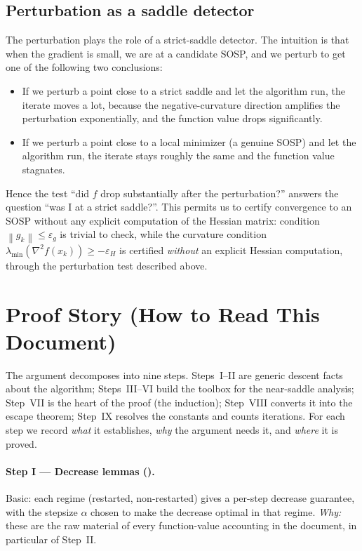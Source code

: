 \documentclass[11pt,a4paper]{article}
\theoremstyle{plain}
\theoremstyle{definition}
\newcommand{\norm}[1]{\left\|#1\right\|}
\newcommand{\eps}{\varepsilon}
\newcommand{\epsg}{\eps_{g}}
\newcommand{\epsH}{\eps_{H}}
\newcommand{\hess}{\nabla^{2}}
\begin{document}
\subsection{Perturbation as a saddle detector}\label{sub:detector}
The perturbation plays the role of a strict-saddle detector. The intuition is that when
the gradient is small, we are at a candidate SOSP, and we perturb to get one of the
following two conclusions:
\begin{itemize}[leftmargin=*]
  \item If we perturb a point close to a strict saddle and let the algorithm run, the
  iterate moves a lot, because the negative-curvature direction amplifies the
  perturbation exponentially, and the function value drops significantly.
  \item If we perturb a point close to a local minimizer (a genuine SOSP) and let the
  algorithm run, the iterate stays roughly the same and the function value stagnates.
\end{itemize}
Hence the test ``did $f$ drop substantially after the perturbation?'' answers the
question ``was I at a strict saddle?''. This permits us to certify convergence to an SOSP
without any explicit computation of the Hessian matrix:
condition $\norm{g_{k}} \leq \epsg$ is trivial to check, while the curvature condition
$\lambda_{\min}(\hess f(x_{k})) \geq -\epsH$ is certified \emph{without} an explicit
Hessian computation, through the perturbation test described above.

\section{Proof Story (How to Read This Document)}\label{sec:roadmap}

The argument decomposes into nine steps. Steps~I--II are generic descent facts about
the algorithm; Steps~III--VI build the toolbox for the near-saddle analysis; Step~VII
is the heart of the proof (the induction); Step~VIII converts it into the escape
theorem; Step~IX resolves the constants and counts iterations. For each step we
record \emph{what} it establishes, \emph{why} the argument needs it, and
\emph{where} it is proved.

\paragraph{Step I --- Decrease lemmas ().}
Basic: each regime (restarted, non-restarted) gives a per-step decrease guarantee,
with the stepsize $\alpha$ chosen to make the decrease optimal in that regime.
\emph{Why:} these are the raw material of every function-value accounting in the
document, in particular of Step~II.
\end{document}

